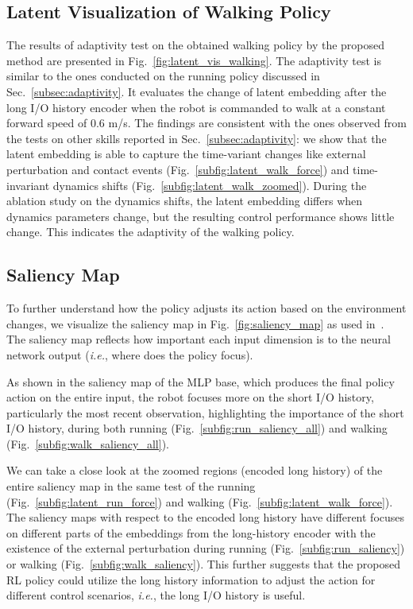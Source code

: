 \subsection{Latent Visualization of Walking Policy}\label{appendix:walking_latent}
The results of adaptivity test on the obtained walking policy by the proposed method are presented in Fig.~\ref{fig:latent_vis_walking}. 
The adaptivity test is similar to the ones conducted on the running policy discussed in Sec.~\ref{subsec:adaptivity}. 
It evaluates the change of latent embedding after the long I/O history encoder when the robot is commanded to walk at a constant forward speed of 0.6 m/s. 
The findings are consistent with the ones observed from the tests on other skills reported in Sec.~\ref{subsec:adaptivity}: we show that the latent embedding is able to capture the time-variant changes like external perturbation and contact events (Fig.~\ref{subfig:latent_walk_force}) and time-invariant dynamics shifts (Fig.~\ref{subfig:latent_walk_zoomed}). 
During the ablation study on the dynamics shifts, the latent embedding differs when dynamics parameters change, but the resulting control performance shows little change. This indicates the adaptivity of the walking policy.  





\subsection{Saliency Map}\label{appendix:saliency}
To further understand how the policy adjusts its action based on the environment changes, we visualize the saliency map in Fig.~\ref{fig:saliency_map} as used in~\cite{lee2020learning}. The saliency map reflects how important each input dimension is to the neural network output (\textit{i.e.}, where does the policy focus).


As shown in the saliency map of the MLP base, which produces the final policy action on the entire input, the robot focuses more on the short I/O history, particularly the most recent observation, highlighting the importance of the short I/O history, during both running (Fig.~\ref{subfig:run_saliency_all}) and walking (Fig.~\ref{subfig:walk_saliency_all}).

We can take a close look at the zoomed regions (encoded long history) of the entire saliency map in the same test of the running (Fig.~\ref{subfig:latent_run_force}) and walking (Fig.~\ref{subfig:latent_walk_force}). The saliency maps with respect to the encoded long history have different focuses on different parts of the embeddings from the long-history encoder with the existence of the external perturbation during running (Fig.~\ref{subfig:run_saliency}) or walking (Fig.~\ref{subfig:walk_saliency}). 
This further suggests that the proposed RL policy could utilize the long history information to adjust the action for different control scenarios, \textit{i.e.}, the long I/O history is useful. 


